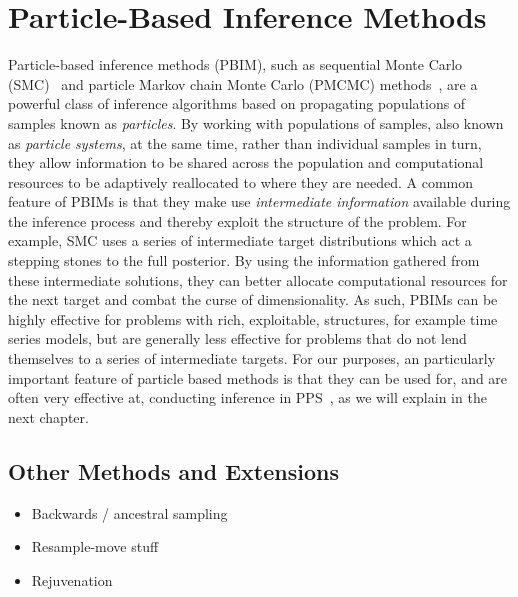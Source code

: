 
\chapter{Particle-Based Inference Methods}
\label{chp:part}

Particle-based inference methods (PBIM), such as sequential Monte Carlo (SMC)~\citep{gordon1993novel,doucet2001introduction} and 
particle Markov chain Monte Carlo (PMCMC) methods~\citep{andrieu2009pseudo,rainforth2016interacting},
are a powerful class of inference algorithms based on propagating populations of samples
known as \emph{particles}.  By working with populations of samples, also known as \emph{particle systems},
 at the same time, rather than individual
samples in turn, they allow information to be shared across the population and computational
resources to be adaptively reallocated to where they are needed.  A common feature of PBIMs is
that they make use \emph{intermediate information} available during the inference process and thereby
exploit the structure of the problem.  For example, SMC uses a series of intermediate target distributions
which act a stepping stones to the full posterior.  By using the information gathered from these intermediate
solutions, they can better allocate computational resources for the next target and combat the curse of
dimensionality.  As such, PBIMs can be highly effective for problems with rich, exploitable, structures, 
for example time series models, but are generally less effective for problems that do not lend themselves
to a series of intermediate targets.  For our purposes, an particularly important feature of particle based
methods is that they can be used for, and are often very effective at, conducting inference in PPS~\citep{wood2014new}, as we will
explain in the next chapter.






\section{Other Methods and Extensions}

\begin{itemize}
	\item Backwards / ancestral sampling
	\item Resample-move stuff
	\item Rejuvenation
\end{itemize}